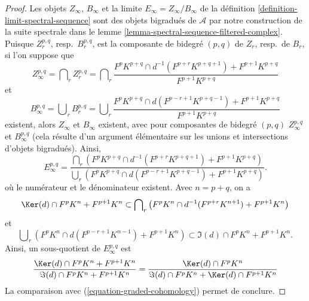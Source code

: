 \begin{proof}
Les objets $Z_\infty$, $B_\infty$ et la limite
$E_\infty = Z_\infty/B_\infty$ de la
définition \ref{definition-limit-spectral-sequence}
sont des objets bigradués de $\mathcal{A}$ par notre construction de la
suite spectrale dans le lemme \ref{lemma-spectral-sequence-filtered-complex}.
Puisque $Z_r^{p, q}$, resp.\ $B_r^{p, q}$, est la composante de bidegré $(p, q)$
de $Z_r$, resp.\ de $B_r$, si l'on suppose que
$$
Z_\infty^{p, q} = \bigcap\nolimits_r Z_r^{p, q} =
\bigcap\nolimits_r
\frac{F^pK^{p + q} \cap d^{-1}(F^{p + r}K^{p + q + 1}) + F^{p + 1}K^{p + q}}
{F^{p + 1}K^{p + q}}
$$
et
$$
B_\infty^{p, q} = \bigcup\nolimits_r B_r^{p, q} =
\bigcup\nolimits_r
\frac{F^pK^{p + q} \cap d(F^{p - r + 1}K^{p + q - 1}) + F^{p + 1}K^{p + q}}
{F^{p + 1}K^{p + q}}
$$
existent, alors $Z_\infty$ et $B_\infty$ existent, avec pour composantes de bidegré $(p, q)$
$Z_\infty^{p, q}$ et $B_\infty^{p, q}$ (cela résulte d'un argument élémentaire
sur les unions et intersections d'objets bigradués). Ainsi,
$$
E_\infty^{p, q} =
\frac{\bigcap_r (F^pK^{p + q} \cap d^{-1}(F^{p + r}K^{p + q + 1})
+ F^{p + 1}K^{p + q})}
{\bigcup_r (F^pK^{p + q} \cap d(F^{p - r + 1}K^{p + q - 1})
+ F^{p + 1}K^{p + q})}.
$$
où le numérateur et le dénominateur existent. Avec $n = p + q$, on a
\begin{equation}
\label{equation-on-top-bigraded}
\Ker(d) \cap F^pK^{n} + F^{p + 1}K^{n}
\subset
\bigcap\nolimits_r
\left(
F^pK^{n} \cap d^{-1}(F^{p + r}K^{n + 1}) + F^{p + 1}K^{n}
\right)
\end{equation}
et
\begin{equation}
\label{equation-at-bottom-bigraded}
\bigcup\nolimits_r
\left(
F^pK^{n} \cap d(F^{p - r + 1}K^{n - 1}) + F^{p + 1}K^{n}
\right)
\subset
\Im(d) \cap F^pK^{n} + F^{p + 1}K^{n}.
\end{equation}
Ainsi, un sous-quotient de $E_\infty^{p, q}$ est
$$
\frac{\Ker(d) \cap F^pK^{n} + F^{p + 1}K^n}
{\Im(d) \cap F^pK^{n} + F^{p + 1}K^{n}} =
\frac{\Ker(d) \cap F^pK^n}{\Im(d) \cap F^pK^n + \Ker(d) \cap F^{p + 1}K^n}
$$
La comparaison avec (\ref{equation-graded-cohomology}) permet de conclure.
\end{proof}

